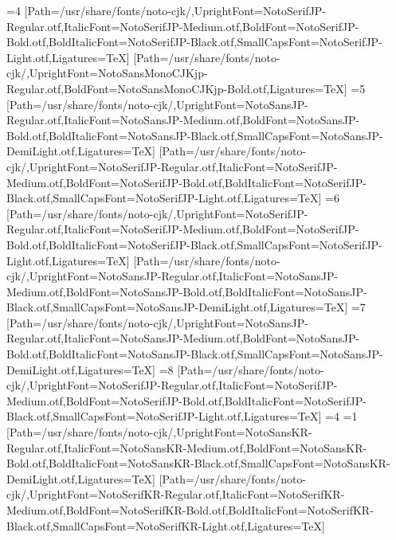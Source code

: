 \else\ifnum\value{CJKFonts}=4
[Path=/usr/share/fonts/noto-cjk/,UprightFont=NotoSerifJP-Regular.otf,ItalicFont=NotoSerifJP-Medium.otf,BoldFont=NotoSerifJP-Bold.otf,BoldItalicFont=NotoSerifJP-Black.otf,SmallCapsFont=NotoSerifJP-Light.otf,Ligatures=TeX]
[Path=/usr/share/fonts/noto-cjk/,UprightFont=NotoSansMonoCJKjp-Regular.otf,BoldFont=NotoSansMonoCJKjp-Bold.otf,Ligatures=TeX]
\else\ifnum\value{CJKFonts}=5
[Path=/usr/share/fonts/noto-cjk/,UprightFont=NotoSansJP-Regular.otf,ItalicFont=NotoSansJP-Medium.otf,BoldFont=NotoSansJP-Bold.otf,BoldItalicFont=NotoSansJP-Black.otf,SmallCapsFont=NotoSansJP-DemiLight.otf,Ligatures=TeX]
[Path=/usr/share/fonts/noto-cjk/,UprightFont=NotoSerifJP-Regular.otf,ItalicFont=NotoSerifJP-Medium.otf,BoldFont=NotoSerifJP-Bold.otf,BoldItalicFont=NotoSerifJP-Black.otf,SmallCapsFont=NotoSerifJP-Light.otf,Ligatures=TeX]
\else\ifnum\value{CJKFonts}=6
[Path=/usr/share/fonts/noto-cjk/,UprightFont=NotoSerifJP-Regular.otf,ItalicFont=NotoSerifJP-Medium.otf,BoldFont=NotoSerifJP-Bold.otf,BoldItalicFont=NotoSerifJP-Black.otf,SmallCapsFont=NotoSerifJP-Light.otf,Ligatures=TeX]
[Path=/usr/share/fonts/noto-cjk/,UprightFont=NotoSansJP-Regular.otf,ItalicFont=NotoSansJP-Medium.otf,BoldFont=NotoSansJP-Bold.otf,BoldItalicFont=NotoSansJP-Black.otf,SmallCapsFont=NotoSansJP-DemiLight.otf,Ligatures=TeX]
\else\ifnum\value{CJKFonts}=7
[Path=/usr/share/fonts/noto-cjk/,UprightFont=NotoSansJP-Regular.otf,ItalicFont=NotoSansJP-Medium.otf,BoldFont=NotoSansJP-Bold.otf,BoldItalicFont=NotoSansJP-Black.otf,SmallCapsFont=NotoSansJP-DemiLight.otf,Ligatures=TeX]
\else\ifnum\value{CJKFonts}=8
[Path=/usr/share/fonts/noto-cjk/,UprightFont=NotoSerifJP-Regular.otf,ItalicFont=NotoSerifJP-Medium.otf,BoldFont=NotoSerifJP-Bold.otf,BoldItalicFont=NotoSerifJP-Black.otf,SmallCapsFont=NotoSerifJP-Light.otf,Ligatures=TeX]
\fi\fi\fi\fi\fi\fi\fi\fi\else
\ifnum\value{CJKLanguage}=4
\ifnum\value{CJKFonts}=1
[Path=/usr/share/fonts/noto-cjk/,UprightFont=NotoSansKR-Regular.otf,ItalicFont=NotoSansKR-Medium.otf,BoldFont=NotoSansKR-Bold.otf,BoldItalicFont=NotoSansKR-Black.otf,SmallCapsFont=NotoSansKR-DemiLight.otf,Ligatures=TeX]
[Path=/usr/share/fonts/noto-cjk/,UprightFont=NotoSerifKR-Regular.otf,ItalicFont=NotoSerifKR-Medium.otf,BoldFont=NotoSerifKR-Bold.otf,BoldItalicFont=NotoSerifKR-Black.otf,SmallCapsFont=NotoSerifKR-Light.otf,Ligatures=TeX]
